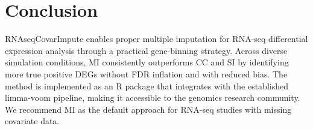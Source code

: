 \documentclass[11pt]{article}
\begin{document}
\section{Conclusion}

RNAseqCovarImpute enables proper multiple imputation for RNA-seq differential expression analysis through a practical gene-binning strategy. Across diverse simulation conditions, MI consistently outperforms CC and SI by identifying more true positive DEGs without FDR inflation and with reduced bias. The method is implemented as an R package that integrates with the established limma-voom pipeline, making it accessible to the genomics research community. We recommend MI as the default approach for RNA-seq studies with missing covariate data.



\end{document}
